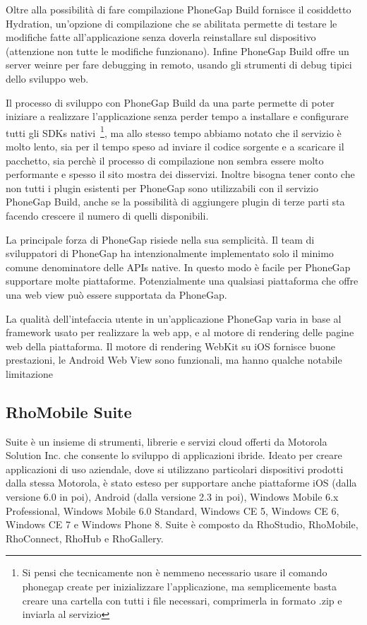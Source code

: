 			Oltre alla possibilità di fare compilazione PhoneGap Build fornisce 
			il cosiddetto Hydration, un'opzione di compilazione che se abilitata 
			permette di testare le modifiche fatte all'applicazione senza doverla 
			reinstallare sul dispositivo (attenzione non tutte le modifiche 
			funzionano). Infine PhoneGap Build offre un server weinre per fare 
			debugging in remoto, usando gli strumenti di debug tipici dello 
			sviluppo web.
			 
			Il processo di sviluppo con PhoneGap Build da una parte permette di 
			poter iniziare a realizzare l'applicazione senza perder tempo a 
			installare e configurare tutti gli SDKs nativi~\footnote{Si pensi 
			che tecnicamente non è nemmeno necessario usare il comando 
			phonegap create per inizializzare l'applicazione, ma semplicemente 
			basta creare una cartella con tutti i file necessari, comprimerla 
			in formato .zip e inviarla al servizio}, ma allo stesso tempo 
			abbiamo notato che il servizio è molto lento, sia per il tempo speso  
			ad inviare il codice sorgente e a scaricare il pacchetto, sia perchè 
			il processo di compilazione non sembra essere molto performante e 
			spesso il sito mostra 
			dei disservizi. Inoltre bisogna tener conto che non tutti i plugin 
			esistenti per PhoneGap sono utilizzabili con il servizio 
			PhoneGap Build, anche se la possibilità di aggiungere plugin di terze 
			parti sta facendo crescere il numero di quelli disponibili.
			
			La principale forza di PhoneGap risiede nella sua semplicità. 
			Il team di sviluppatori di PhoneGap ha intenzionalmente implementato 
			solo il minimo comune denominatore delle APIs native. In questo modo 
			è facile per PhoneGap supportare molte piattaforme. Potenzialmente 
			una qualsiasi piattaforma che offre una web view può essere supportata 
			da PhoneGap.
			
			La qualità dell'intefaccia utente in un'applicazione PhoneGap 
			varia in base al framework usato per realizzare la web app, e al 
			motore di rendering delle pagine web della piattaforma.
			Il motore di rendering WebKit su iOS fornisce buone prestazioni, le 
			Android Web View sono funzionali, ma hanno qualche notabile 
			limitazione~\citep{Web:KevinSite}
			

		\subsection{RhoMobile Suite}
			\rhom{} Suite è un insieme di strumenti, librerie e servizi cloud
			offerti da Motorola Solution Inc. che consente lo sviluppo di
			applicazioni ibride. Ideato per creare applicazioni di uso aziendale,
			dove si utilizzano particolari dispositivi prodotti dalla stessa
			Motorola, è stato esteso per supportare anche piattaforme iOS
			(dalla versione 6.0 in poi), Android (dalla versione 2.3 in poi),
			Windows Mobile 6.x Professional, Windows Mobile 6.0 Standard,
			Windows CE 5, Windows CE 6, Windows CE 7 e Windows Phone 8.
			\rhom{} Suite è composto da RhoStudio, RhoMobile, RhoConnect,
			RhoHub e RhoGallery.
